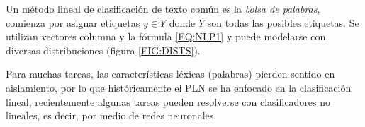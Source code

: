 Un método lineal de clasificación de texto común es la \emph{bolsa de palabras}, comienza por asignar etiquetas $y\in Y$ donde $Y$ son todas las posibles etiquetas. Se utilizan vectores columna y la fórmula \ref{EQ:NLP1} y puede modelarse con diversas distribuciones (figura \ref{FIG:DISTS}).

Para muchas tareas, las características léxicas (palabras) pierden sentido en aislamiento, por lo que históricamente el PLN se ha enfocado en la clasificación lineal, recientemente algunas tareas pueden resolverse con clasificadores no lineales, es decir, por medio de redes neuronales.